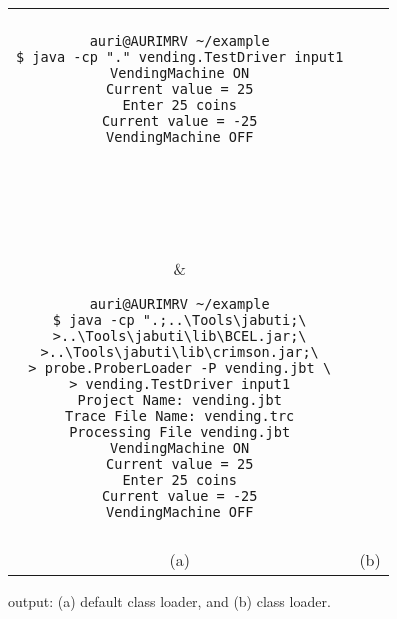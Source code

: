 \begin{figure}[!ht]
\begin{center}\cmdsize
\begin{tabular}{|c|c|}\hline
&\\
\begin{minipage}{2.7in}
\begin{verbatim}
auri@AURIMRV ~/example
$ java -cp "." vending.TestDriver input1
VendingMachine ON
Current value = 25
Enter 25 coins
Current value = -25
VendingMachine OFF







\end{verbatim}
\end{minipage}
&
\begin{minipage}{3.6in}
\begin{verbatim}
auri@AURIMRV ~/example
$ java -cp ".;..\Tools\jabuti;\
>..\Tools\jabuti\lib\BCEL.jar;\
>..\Tools\jabuti\lib\crimson.jar;\
> probe.ProberLoader -P vending.jbt \
> vending.TestDriver input1
Project Name: vending.jbt
Trace File Name: vending.trc
Processing File vending.jbt
VendingMachine ON
Current value = 25
Enter 25 coins
Current value = -25
VendingMachine OFF
\end{verbatim}
\end{minipage}\\
&\\\hline
\multicolumn{1}{c}{(a)} & \multicolumn{1}{c}{(b)}\\
\end{tabular}
\end{center}
\caption{ output: (a) default class loader, and (b)
\toolname class loader.}\label{fig:driver-output}
\end{figure}
